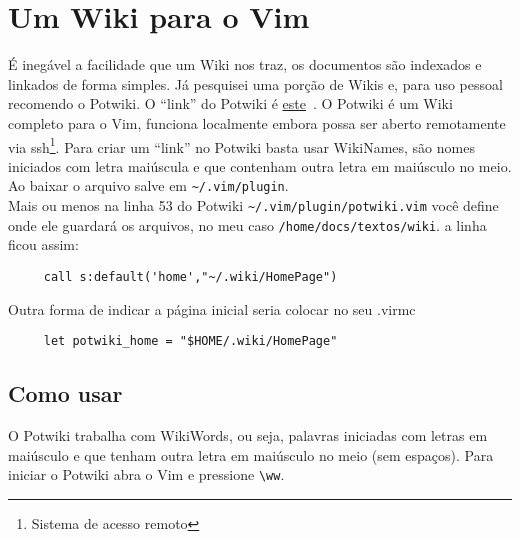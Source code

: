 %
%	
\chapter{Um Wiki para o Vim}\label{cha:Um Wiki para o Vim}

É inegável a facilidade que um Wiki nos traz, os documentos são
indexados e linkados de forma simples. Já pesquisei uma porção de
Wikis e, para uso pessoal recomendo o Potwiki.  O ``link'' do Potwiki é 
\href{http://www.vim.org/scripts/script.php?script\_id=1018}{este}~\cite{PluginPotWiki}.
O Potwiki é um Wiki completo para o Vim, funciona localmente embora
possa ser aberto remotamente via ssh\footnote{Sistema de acesso remoto}.
Para criar um ``link'' no Potwiki basta usar WikiNames, são nomes
iniciados com letra maiúscula e que contenham outra letra em maiúsculo
no meio. \\

Ao baixar o arquivo salve em \verb|~/.vim/plugin|. \\

Mais ou menos na linha 53 do Potwiki \verb|~/.vim/plugin/potwiki.vim| você
define onde ele guardará os arquivos, no meu caso
\verb|/home/docs/textos/wiki|. a linha ficou assim:

\begin{verbatim}
     call s:default('home',"~/.wiki/HomePage")
\end{verbatim}

Outra forma de indicar a página inicial seria colocar no seu .virmc

\begin{verbatim}
     let potwiki_home = "$HOME/.wiki/HomePage"
\end{verbatim}

\section{Como usar}
\label{Como usar}

O Potwiki trabalha com WikiWords, ou seja, palavras iniciadas com
letras em maiúsculo e que tenham outra letra em maiúsculo no meio (sem
espaços). Para iniciar o Potwiki abra o Vim e pressione \verb|\ww|.

